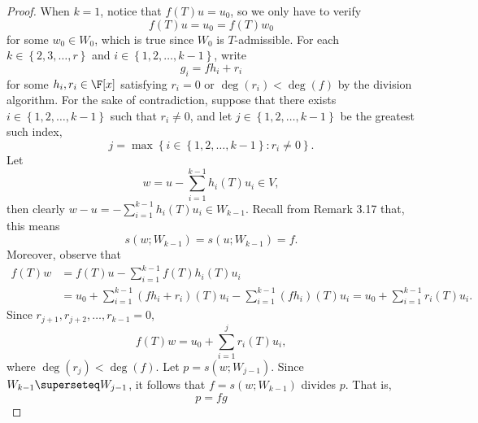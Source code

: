 \documentclass[linearalgebraII]{subfiles}
\begin{document}
    \begin{proof}
        When $k=1$, notice that $f(T)u=u_0$, so we only have to verify
        \begin{equation*}
            f(T)u = u_0 = f(T)w_0
        \end{equation*}
        for some $w_0\in W_0$, which is true since $W_0$ is $T$-admissible. For each $k\in \left\lbrace 2,3,\ldots,r \right\rbrace$ and $i\in\left\lbrace 1,2,\ldots,k-1 \right\rbrace$, write
        \begin{equation*}
            g_i = fh_i+r_i
        \end{equation*}
        for some $h_i,r_i\in\F[x]$ satisfying $r_i=0$ or $\deg(r_i)<\deg(f)$ by the division algorithm. For the sake of contradiction, suppose that there exists $i\in \left\lbrace 1,2,\ldots,k-1 \right\rbrace$ such that $r_i\neq 0$, and let $j\in\left\lbrace 1,2,\ldots,k-1 \right\rbrace$ be the greatest such index,
        \begin{equation*}
            j = \max\left\lbrace i\in\left\lbrace 1,2,\ldots,k-1 \right\rbrace :r_i\neq 0 \right\rbrace .
        \end{equation*}
        Let
        \begin{equation*}
            w = u - \sum^{k-1}_{i=1} h_i(T)u_i\in V,
        \end{equation*}
        then clearly $w-u = -\sum^{k-1}_{i=1} h_i(T)u_i\in W_{k-1}$. Recall from Remark 3.17 that, this means
        \begin{equation*}
            s(w;W_{k-1}) = s(u;W_{k-1}) = f.
        \end{equation*}
        Moreover, observe that
        \begin{align*}
            f(T)w & = f(T)u - \sum^{k-1}_{i=1} f(T)h_i(T)u_i \\
                  & = u_0 + \sum^{k-1}_{i=1} \left( fh_i+r_i \right) (T)u_i - \sum^{k-1}_{i=1} \left( fh_i \right) (T)u_i = u_0 + \sum^{k-1}_{i=1} r_i(T)u_i.
        \end{align*} 
        Since $r_{j+1}, r_{j+2}, \ldots, r_{k-1}=0$,
        \begin{equation*}
            f(T)w = u_0 + \sum^{j}_{i=1} r_i(T)u_i,
        \end{equation*}
        where $\deg\left(r_j\right)<\deg(f)$. Let $p=s\left( w;W_{j-1} \right) $. Since $W_{k-1}\superseteq W_{j-1}$, it follows that $f = s\left( w;W_{k-1} \right) $ divides $p$. That is,
        \begin{equation*}
            p = fg

\end{equation*}
\end{proof}
\end{document}
